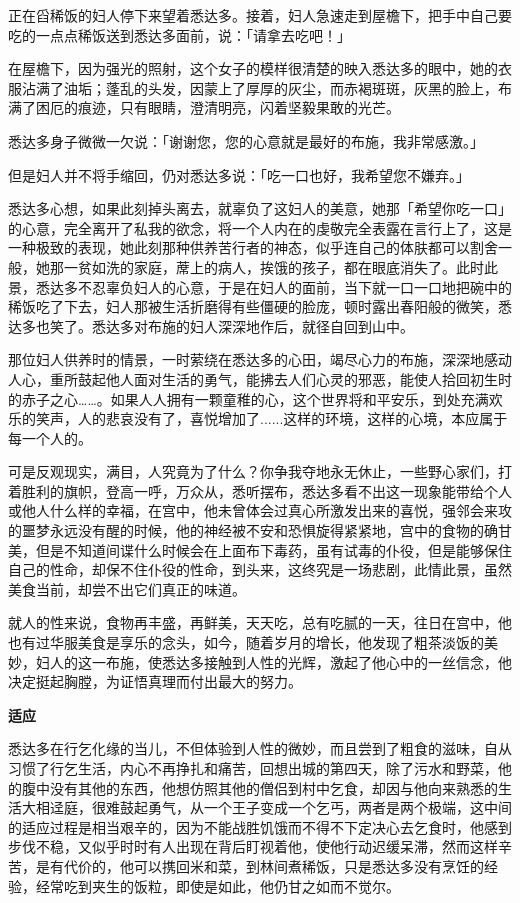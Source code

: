 \documentclass[twoside,openany]{book}
\newcommand{\mt}[1]{\textbullet \textbf{#1}}
\begin{document}
正在舀稀饭的妇人停下来望着悉达多。接着，妇人急速走到屋檐下，把手中自己要吃的一点点稀饭送到悉达多面前，说：「请拿去吃吧！」

在屋檐下，因为强光的照射，这个女子的模样很清楚的映入悉达多的眼中，她的衣服沾满了油垢；蓬乱的头发，因蒙上了厚厚的灰尘，而赤褐斑斑，灰黑的脸上，布满了困厄的痕迹，只有眼睛，澄清明亮，闪着坚毅果敢的光芒。

悉达多身子微微一欠说：「谢谢您，您的心意就是最好的布施，我非常感激。」

但是妇人并不将手缩回，仍对悉达多说：「吃一口也好，我希望您不嫌弃。」

悉达多心想，如果此刻掉头离去，就辜负了这妇人的美意，她那「希望你吃一口」的心意，完全离开了私我的欲念，将一个人内在的虔敬完全表露在言行上了，这是一种极致的表现，她此刻那种供养苦行者的神态，似乎连自己的体肤都可以割舍一般，她那一贫如洗的家庭，蓆上的病人，挨饿的孩子，都在眼底消失了。此时此景，悉达多不忍辜负妇人的心意，于是在妇人的面前，当下就一口一口地把碗中的稀饭吃了下去，妇人那被生活折磨得有些僵硬的脸庞，顿时露出春阳般的微笑，悉达多也笑了。悉达多对布施的妇人深深地作后，就径自回到山中。

那位妇人供养时的情景，一时萦绕在悉达多的心田，竭尽心力的布施，深深地感动人心，重所鼓起他人面对生活的勇气，能拂去人们心灵的邪恶，能使人拾回初生时的赤子之心……。如果人人拥有一颗童稚的心，这个世界将和平安乐，到处充满欢乐的笑声，人的悲哀没有了，喜悦增加了......这样的环境，这样的心境，本应属于每一个人的。

可是反观现实，满目，人究竟为了什么？你争我夺地永无休止，一些野心家们，打着胜利的旗帜，登高一呼，万众从，悉听摆布，悉达多看不出这一现象能带给个人或他人什么样的幸福，在宫中，他未曾体会过真心所激发出来的喜悦，强邻会来攻的噩梦永远没有醒的时候，他的神经被不安和恐惧旋得紧紧地，宫中的食物的确甘美，但是不知道间谍什么时候会在上面布下毒药，虽有试毒的仆役，但是能够保住自己的性命，却保不住仆役的性命，到头来，这终究是一场悲剧，此情此景，虽然美食当前，却尝不出它们真正的味道。

就人的性来说，食物再丰盛，再鲜美，天天吃，总有吃腻的一天，往日在宫中，他也有过华服美食是享乐的念头，如今，随着岁月的增长，他发现了粗茶淡饭的美妙，妇人的这一布施，使悉达多接触到人性的光辉，激起了他心中的一丝信念，他决定挺起胸膛，为证悟真理而付出最大的努力。

\mt{适应}

悉达多在行乞化缘的当儿，不但体验到人性的微妙，而且尝到了粗食的滋味，自从习惯了行乞生活，内心不再挣扎和痛苦，回想出城的第四天，除了污水和野菜，他的腹中没有其他的东西，他想仿照其他的僧侣到村中乞食，却因与他向来熟悉的生活大相迳庭，很难鼓起勇气，从一个王子变成一个乞丐，两者是两个极端，这中间的适应过程是相当艰辛的，因为不能战胜饥饿而不得不下定决心去乞食时，他感到步伐不稳，又似乎时时有人出现在背后盯视着他，使他行动迟缓呆滞，然而这样辛苦，是有代价的，他可以携回米和菜，到林间煮稀饭，只是悉达多没有烹饪的经验，经常吃到夹生的饭粒，即使是如此，他仍甘之如而不觉尔。
\end{document}
